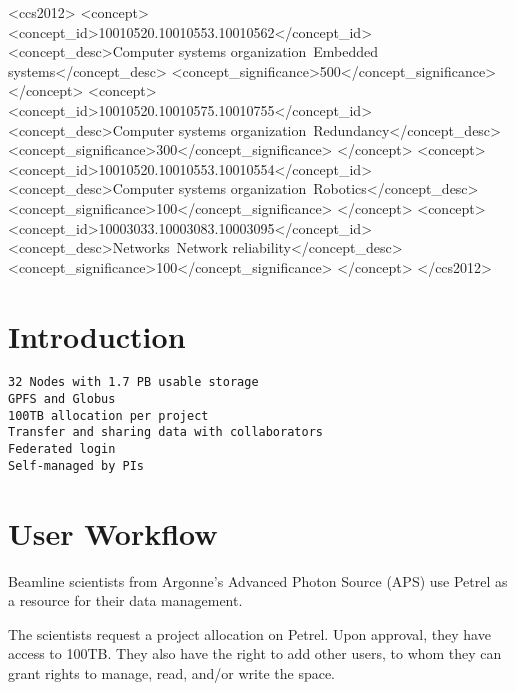 \documentclass[sigconf]{acmart}
\begin{document}
%
%
\begin{CCSXML}
<ccs2012>
 <concept>
  <concept_id>10010520.10010553.10010562</concept_id>
  <concept_desc>Computer systems organization~Embedded systems</concept_desc>
  <concept_significance>500</concept_significance>
 </concept>
 <concept>
  <concept_id>10010520.10010575.10010755</concept_id>
  <concept_desc>Computer systems organization~Redundancy</concept_desc>
  <concept_significance>300</concept_significance>
 </concept>
 <concept>
  <concept_id>10010520.10010553.10010554</concept_id>
  <concept_desc>Computer systems organization~Robotics</concept_desc>
  <concept_significance>100</concept_significance>
 </concept>
 <concept>
  <concept_id>10003033.10003083.10003095</concept_id>
  <concept_desc>Networks~Network reliability</concept_desc>
  <concept_significance>100</concept_significance>
 </concept>
</ccs2012>  
\end{CCSXML}





\maketitle

\section{Introduction}

\begin{verbatim}
32 Nodes with 1.7 PB usable storage
GPFS and Globus
100TB allocation per project
Transfer and sharing data with collaborators
Federated login
Self-managed by PIs
\end{verbatim}


\section{User Workflow}


Beamline scientists from Argonne's Advanced Photon Source (APS) use Petrel as a resource for their data management.

The scientists request a project allocation on Petrel. Upon approval, they have access to 100TB. They also have the right to add other users, to whom they can grant rights to manage, read, and/or write the space.
\end{document}
